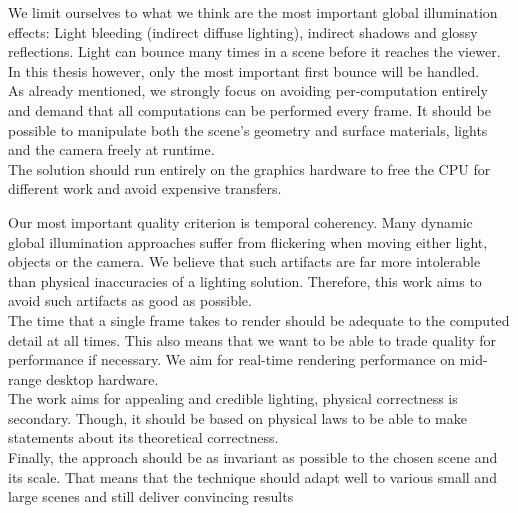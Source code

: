 \documentclass[thesis.tex]{subfiles}
\begin{document}
We limit ourselves to what we think are the most important global illumination effects: Light bleeding (indirect diffuse lighting), indirect shadows and glossy reflections.
Light can bounce many times in a scene before it reaches the viewer.
In this thesis however, only the most important first bounce will be handled.
\\
As already mentioned, we strongly focus on avoiding per-computation entirely and demand that all computations can be performed every frame.
It should be possible to manipulate both the scene's geometry and surface materials, lights and the camera freely at runtime.
\\
The solution should run entirely on the graphics hardware to free the CPU for different work and avoid expensive transfers.

Our most important quality criterion is temporal coherency.
Many dynamic global illumination approaches suffer from flickering when moving either light, objects or the camera.
We believe that such artifacts are far more intolerable than physical inaccuracies of a lighting solution.
Therefore, this work aims to avoid such artifacts as good as possible.
\\
The time that a single frame takes to render should be adequate to the computed detail at all times.
This also means that we want to be able to trade quality for performance if necessary.
We aim for real-time rendering performance on mid-range desktop hardware.
\\
The work aims for appealing and credible lighting, physical correctness is secondary.
Though, it should be based on physical laws to be able to make statements about its theoretical correctness.
\\
Finally, the approach should be as invariant as possible to the chosen scene and its scale.
That means that the technique should adapt well to various small and large scenes and still deliver convincing results 

\end{document}
